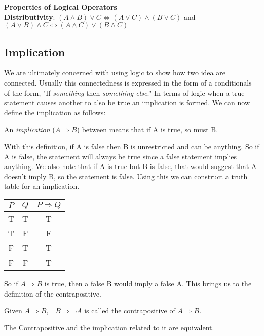 \begin{thm}
	\textbf{Properties of Logical Operators}\\
	\label{thm:proplogical}
	\textbf{Distributivity}: $(A \land B) \lor C \iff (A \lor C) \land (B \lor C)$ and $(A \lor B) \land C \iff (A \land C) \lor (B \land C)$
	
\end{thm}

\subsection{Implication}
We are ultimately concerned with using logic to show how two idea are connected.
Usually this connectedness is expressed in the form of a conditionals of the form, "If \emph{something} then \emph{something else}."
In terms of logic when a true statement causes another to also be true an implication is formed.
We can now define the implication as follows:

\begin{defn}
	An \emph{\underline{implication}} ($A \Rightarrow B$) between means that if A is true, so must B.
\end{defn}
With this definition, if A is false then B is unrestricted and can be anything.
So if A is false, the statement will always be true since a false statement implies anything.
We also note that if A is true but B is false, that would suggest that A doesn't imply B, so the statement is false.
Using this we can construct a truth table for an implication.

\begin{center}
	\begin{tabular}{cc|c}
		$P$ & $Q$ & $P \Rightarrow Q$ \\
		\hline
		T & T & T \\
		T & F & F \\
		F & T & T \\
		F & F & T \\
	\end{tabular}
\end{center}

So if $A \Rightarrow B$ is true, then a false B would imply a false A.
This brings us to the definition of the contrapositive.

\begin{defn}
	Given $A \Rightarrow B$, $\neg B \Rightarrow \neg A$ is called the contrapositive of $A \Rightarrow B$.
\end{defn}

The Contrapositive and the implication related to it are equivalent.
